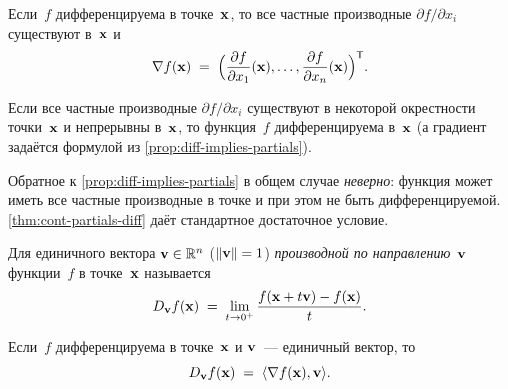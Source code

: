 \begin{proposition}
\label{prop:diff-implies-partials}
Если~$f$ дифференцируема в точке~$\mathbf{x}$, то все частные производные
$\partial f / \partial x_i$ существуют в~$\mathbf{x}$ и
\[
  \nabla f(\mathbf{x}) \;=\; \Bigl(\frac{\partial f}{\partial x_1}(\mathbf{x}), \dots, \frac{\partial f}{\partial x_n}(\mathbf{x})\Bigr)^{\mathsf{T}}.
\]
\end{proposition}

\begin{theorem}
\label{thm:cont-partials-diff}
Если все частные производные $\partial f / \partial x_i$ существуют в
некоторой окрестности точки~$\mathbf{x}$ и непрерывны в~$\mathbf{x}$, то
функция~$f$ дифференцируема в~$\mathbf{x}$ (а градиент задаётся
формулой из \cref{prop:diff-implies-partials}).
\end{theorem}

Обратное к \cref{prop:diff-implies-partials} в общем случае
\emph{неверно}: функция может иметь все частные производные в точке и
при этом не быть дифференцируемой. \cref{thm:cont-partials-diff} даёт
стандартное достаточное условие.

\begin{definition}
\label{def:directional-derivative}
Для единичного вектора $\mathbf{v} \in \mathbb{R}^n$ ($\|\mathbf{v}\| = 1$)
\emph{производной по направлению}~$\mathbf{v}$ функции~$f$ в
точке~$\mathbf{x}$ называется
\[
  D_{\mathbf{v}} f(\mathbf{x}) \;=\; \lim_{t \to 0^{+}} \frac{f(\mathbf{x} + t\mathbf{v}) - f(\mathbf{x})}{t}.
\]
\end{definition}

\begin{theorem}
\label{thm:directional-derivative-formula}
Если~$f$ дифференцируема в точке~$\mathbf{x}$ и $\mathbf{v}$~--- единичный
вектор, то
\[
  D_{\mathbf{v}} f(\mathbf{x}) \;=\; \langle \nabla f(\mathbf{x}), \mathbf{v} \rangle.
\]
\end{theorem}

